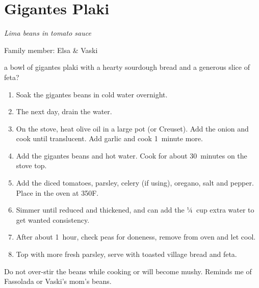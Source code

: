 \chapter{Gigantes Plaki}
\label{ch:gigantes-plaki}


\textit{Lima beans in tomato sauce}

Family member: Elsa \& Vaski


 a bowl of gigantes plaki with a hearty sourdough bread and a generous slice of feta?

\bigskip

\begin{enumerate}
    \item Soak the gigantes beans in cold water overnight.
    \item The next day, drain the water.
    \item On the stove, heat olive oil in a large pot (or Creuset). Add the onion and cook until translucent. Add garlic and cook 1~minute more.
    \item Add the gigantes beans and hot water. Cook for about 30~minutes on the stove top.
    \item Add the diced tomatoes, parsley, celery (if using), oregano, salt and pepper. Place in the oven at 350\degree F.
    \item Simmer until reduced and thickened, and can add the ¼~cup extra water to get wanted consistency.
    \item After about 1~hour, check peas for doneness, remove from oven and let cool.
    \item Top with more fresh parsley, serve with toasted village bread and feta.
\end{enumerate}

Do not over-stir the beans while cooking or will become mushy.
Reminds me of Fassolada or Vaski's mom's beans.

